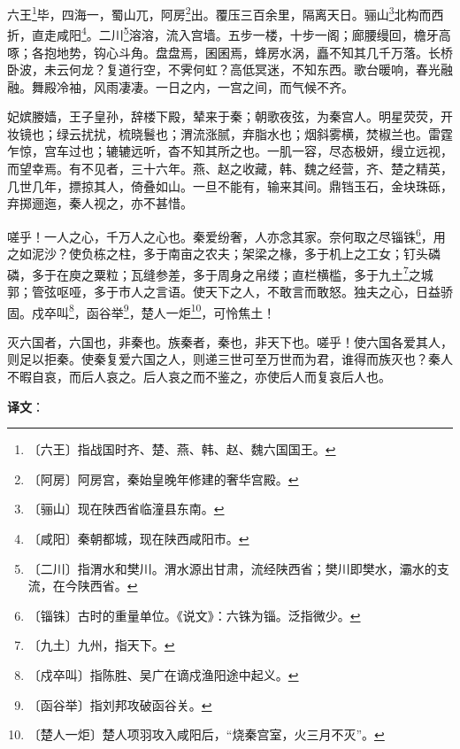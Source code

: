 \documentclass[12pt,UTF-8,openany,a4]{ctexbook}
\begin{document}
\begin{large}
    
    六王\footnote{〔六王〕\yiwen 指战国时齐、楚、燕、韩、赵、魏六国国王。}毕，四海一，蜀山兀，阿房\footnote{〔阿房〕\yiwen 阿房宫，秦始皇晚年修建的奢华宫殿。}出。覆压三百余里，隔离天日。骊山\footnote{〔骊山〕\yiwen 现在陕西省临潼县东南。}北构而西折，直走咸阳\footnote{〔咸阳〕\yiwen 秦朝都城，现在陕西咸阳市。}。二川\footnote{〔二川〕\yiwen 指渭水和樊川。渭水源出甘肃，流经陕西省；樊川即樊水，灞水的支流，在今陕西省。}溶溶，流入宫墙。五步一楼，十步一阁；廊腰缦回，檐牙高啄；各抱地势，钩心斗角。盘盘焉，囷囷焉，蜂房水涡，矗不知其几千万落。长桥卧波，未云何龙？复道行空，不霁何虹？高低冥迷，不知东西。歌台暖响，春光融融。舞殿冷袖，风雨凄凄。一日之内，一宫之间，而气候不齐。
    
    妃嫔媵嫱，王子皇孙，辞楼下殿，辇来于秦；朝歌夜弦，为秦宫人。明星荧荧，开妆镜也；绿云扰扰，梳晓鬟也；渭流涨腻，弃脂水也；烟斜雾横，焚椒兰也。雷霆乍惊，宫车过也；辘辘远听，杳不知其所之也。一肌一容，尽态极妍，缦立远视，而望幸焉。有不见者，三十六年。燕、赵之收藏，韩、魏之经营，齐、楚之精英，几世几年，摽掠其人，倚叠如山。一旦不能有，输来其间。鼎铛玉石，金块珠砾，弃掷逦迤，秦人视之，亦不甚惜。
    
    嗟乎！一人之心，千万人之心也。秦爱纷奢，人亦念其家。奈何取之尽锱铢\footnote{〔锱铢〕\yiwen 古时的重量单位。《说文》：六铢为锱。泛指微少。}，用之如泥沙？使负栋之柱，多于南亩之农夫；架梁之椽，多于机上之工女；钉头磷磷，多于在庾之粟粒；瓦缝参差，多于周身之帛缕；直栏横槛，多于九土\footnote{〔九土〕\yiwen 九州，指天下。}之城郭；管弦呕哑，多于市人之言语。使天下之人，不敢言而敢怒。独夫之心，日益骄固。戍卒叫\footnote{〔戍卒叫〕\yiwen 指陈胜、吴广在谪戍渔阳途中起义。}，函谷举\footnote{〔函谷举〕\yiwen 指刘邦攻破函谷关。}，楚人一炬\footnote{〔楚人一炬〕\yiwen 楚人项羽攻入咸阳后，“烧秦宫室，火三月不灭”。}，可怜焦土！
    
    灭六国者，六国也，非秦也。族秦者，秦也，非天下也。嗟乎！使六国各爱其人，则足以拒秦。使秦复爱六国之人，则递三世可至万世而为君，谁得而族灭也？秦人不暇自哀，而后人哀之。后人哀之而不鉴之，亦使后人而复哀后人也。

\end{large}


\newpage

\begin{Large}
   \noindent \textbf{译文}：
\end{Large}

\vspace{1em}
\end{document}
